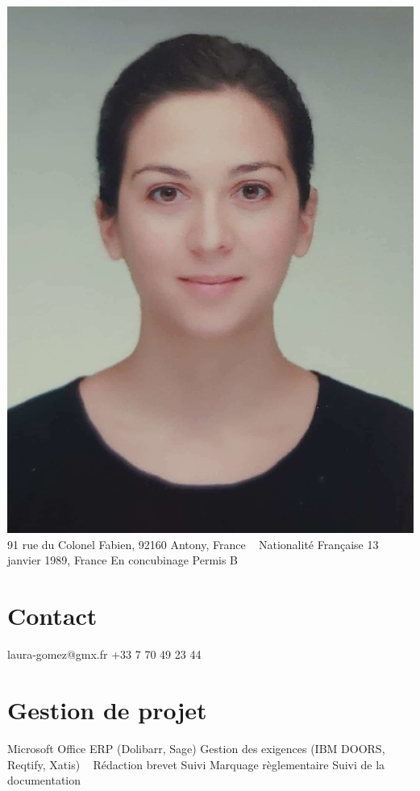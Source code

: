 \documentclass{cv-style}     %
\begin{document}


\begin{aside}
    \includegraphics[width=.8\columnwidth]{img/LG}
    91 rue du Colonel Fabien, 92160 Antony, France
    ~
    Nationalité Française
    13 janvier 1989, France
    En concubinage
    Permis B
    \section{Contact}
    laura-gomez@gmx.fr
    +33 7 70 49 23 44
    \section{Gestion de projet}
    Microsoft Office
    ERP (Dolibarr, Sage)
    Gestion des exigences 
    (IBM DOORS, Reqtify, Xatis)
    ~
    Rédaction brevet
    Suivi Marquage règlementaire
    Suivi de la documentation

\end{aside}
\end{document}
